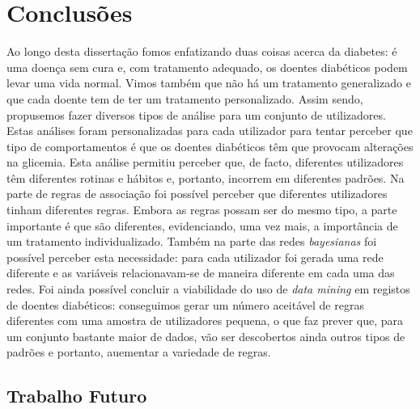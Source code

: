 \chapter{Conclusões}\label{chap:conc}

Ao longo desta dissertação fomos enfatizando duas coisas acerca da diabetes: é uma doença sem cura e, com tratamento adequado, os doentes diabéticos podem levar uma vida normal. Vimos também que não há um tratamento generalizado e que cada doente tem de ter um tratamento personalizado. Assim sendo, propusemos fazer diversos tipos de análise para um conjunto de utilizadores. Estas análises foram personalizadas para cada utilizador para tentar perceber que tipo de comportamentos é que os doentes diabéticos têm que provocam alterações na glicemia. Esta análise permitiu perceber que, de facto, diferentes utilizadores têm diferentes rotinas e hábitos e, portanto, incorrem em diferentes padrões. Na parte de regras de associação foi possível perceber que diferentes utilizadores tinham diferentes regras. Embora as regras possam ser do mesmo tipo, a parte importante é que são diferentes, evidenciando, uma vez mais, a importância de um tratamento individualizado. Também na parte das redes \textit{bayesianas} foi possível perceber esta necessidade: para cada utilizador foi gerada uma rede diferente e as variáveis relacionavam-se de maneira diferente em cada uma das redes. 
Foi ainda possível concluir a viabilidade do uso de \textit{data mining} em registos de doentes diabéticos: conseguimos gerar um número aceitável de regras diferentes com uma amostra de utilizadores pequena, o que faz prever que, para um conjunto bastante maior de dados, vão ser descobertos ainda outros tipos de padrões e portanto, auementar a variedade de regras. 



\section{Trabalho Futuro}\label{sec:trab}


